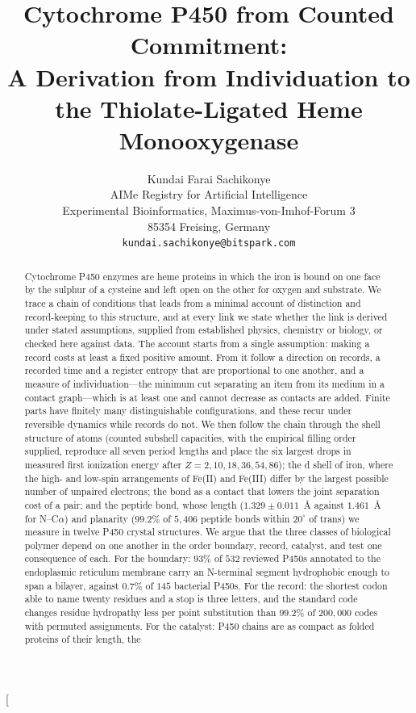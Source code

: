 \documentclass[10pt,twocolumn,a4paper]{article}
\title{Cytochrome P450 from Counted Commitment:\\[4pt]
\large A Derivation from Individuation to the Thiolate-Ligated Heme Monooxygenase}
\author{%
Kundai Farai Sachikonye\\[0.3em]
\small AIMe Registry for Artificial Intelligence\\
\small Experimental Bioinformatics, Maximus-von-Imhof-Forum 3\\
\small 85354 Freising, Germany\\
\small \texttt{kundai.sachikonye@bitspark.com}}
\date{}
\begin{document}
\twocolumn[
\begin{@twocolumnfalse}
\maketitle
\begin{abstract}
\noindent
Cytochrome P450 enzymes are heme proteins in which the iron is bound on one
face by the sulphur of a cysteine and left open on the other for oxygen and
substrate. We trace a chain of conditions that leads from a minimal account
of distinction and record-keeping to this structure, and at every link we
state whether the link is derived under stated assumptions, supplied from
established physics, chemistry or biology, or checked here against data.
The account starts from a single assumption: making a record costs at least a
fixed positive amount. From it follow a direction on records, a recorded time
and a register entropy that are proportional to one another, and a measure of
individuation---the minimum cut separating an item from its medium in a
contact graph---which is at least one and cannot decrease as contacts are
added. Finite parts have finitely many distinguishable configurations, and
these recur under reversible dynamics while records do not. We then follow
the chain through the shell structure of atoms (counted subshell capacities,
with the empirical filling order supplied, reproduce all seven period lengths
and place the six largest drops in measured first ionization energy after
$Z=2,10,18,36,54,86$); the d shell of iron, where the high- and low-spin
arrangements of Fe(II) and Fe(III) differ by the largest possible number of
unpaired electrons; the bond as a contact that lowers the joint separation
cost of a pair; and the peptide bond, whose length ($1.329\pm0.011$~\AA{}
against $1.461$~\AA{} for N--C$\alpha$) and planarity ($99.2\%$ of $5{,}406$
peptide bonds within $20^\circ$ of trans) we measure in twelve P450 crystal
structures. We argue that the three classes of biological polymer depend on
one another in the order boundary, record, catalyst, and test one consequence
of each. For the boundary: $93\%$ of $532$ reviewed P450s annotated to the
endoplasmic reticulum membrane carry an N-terminal segment hydrophobic enough
to span a bilayer, against $0.7\%$ of $145$ bacterial P450s. For the record:
the shortest codon able to name twenty residues and a stop is three letters,
and the standard code changes residue hydropathy less per point substitution
than $99.2\%$ of $200{,}000$ codes with permuted assignments. For the
catalyst: P450 chains are as compact as folded proteins of their length, the

\end{abstract}
\end{@twocolumnfalse}
\end{document}
